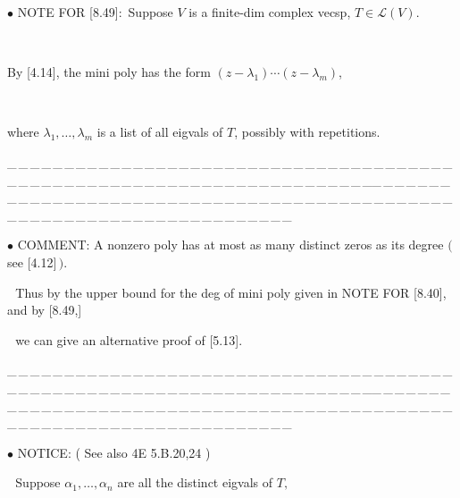 \documentclass[a4paper, 11pt, UTF8]{article}
\def\Lm{\mathcal{L}}
\begin{document}
\begin{large}
{\small $\bullet$} {\timesbf N{\small OTE} F{\small OR} [8.49]:}\,\,\,\Large Suppose $V$ is a finite-dim complex vecsp, $T\in\Lm(V).$\par\,\,
\centerline{By [4.14], the mini poly has the form $(z -\lambda_1 ) \cdots (z - \lambda_m)$,}\par\,\,
\centerline{\qquad\qquad where $\lambda_1,\dots,\lambda_m$ is a list of all eigvals of $T$, possibly with repetitions.}\large\par
{\tiny \_\,\_\,\_\,\_\,\_\,\_\,\_\,\_\,\_\,\_\,\_\,\_\,\_\,\_\,\_\,\_\,\_\,\_\,\_\,\_\,\_\,\_\,\_\,\_\,\_\,\_\,\_\,\_\,\_\,\_\,\_\,\_\,\_\,\_\,\_\,\_\,\_\,\_\,\_\,\_\,\_\,\_\,\_\,\_\,\_\,\_\,\_\,\_\,\_\,\_\,\_\,\_\,\_\,\_\,\_\,\_\,\_\,\_\,\_\,\_\,\_\,\_\,\_\,\_\,\_\,\_\,\_\,\_\,\_\,\_\,\_\_\,\_\,\_\,\_\,\_\,\_\,\_\,\_\,\_\,\_\,\_\,\_\,\_\,\_\,\_\,\_\,\_\,\_\,\_\,\_\,\_\,\_\,\_\,\_\,\_\,\_\,\_\,\_\,\_\,\_\,\_\,\_\,\_\,\_\,\_\,\_\,\_\,\_\,\_\,\_\,\_\,\_\,\_\,\_\,\_\,\_\,\_\,\_\,\_\,\_\,\_\,\_\,\_\,\_\,\_\,\_\,\_\,\_\,\_\,\_\,\_\,\_\,\_\,\_\,\_\,\_\,\_\,\_\,\_\,\_\,\_}\par
{\small $\bullet$} {\timesbf\large C{\small OMMENT}}:
{\Large A nonzero poly has at most as many distinct zeros as its degree $($ see $[$4.12$]\,)$.}\par\,\,
{\Large Thus by the upper bound for the deg of mini poly given in {\large N{\small OTE} F{\small OR} [8.40]}, and by [8.49,]}{\par}\,\,
{\Large we can {\timessc give an alternative proof of {\timesnr[}5.13{\timesnr]}}.}{\par}%
{\tiny \_\,\_\,\_\,\_\,\_\,\_\,\_\,\_\,\_\,\_\,\_\,\_\,\_\,\_\,\_\,\_\,\_\,\_\,\_\,\_\,\_\,\_\,\_\,\_\,\_\,\_\,\_\,\_\,\_\,\_\,\_\,\_\,\_\,\_\,\_\,\_\,\_\,\_\,\_\,\_\,\_\,\_\,\_\,\_\,\_\,\_\,\_\,\_\,\_\,\_\,\_\,\_\,\_\,\_\,\_\,\_\,\_\,\_\,\_\,\_\,\_\,\_\,\_\,\_\,\_\,\_\,\_\,\_\,\_\,\_\,\_\_\,\_\,\_\,\_\,\_\,\_\,\_\,\_\,\_\,\_\,\_\,\_\,\_\,\_\,\_\,\_\,\_\,\_\,\_\,\_\,\_\,\_\,\_\,\_\,\_\,\_\,\_\,\_\,\_\,\_\,\_\,\_\,\_\,\_\,\_\,\_\,\_\,\_\,\_\,\_\,\_\,\_\,\_\,\_\,\_\,\_\,\_\,\_\,\_\,\_\,\_\,\_\,\_\,\_\,\_\,\_\,\_\,\_\,\_\,\_\,\_\,\_\,\_\,\_\,\_\,\_\,\_\,\_\,\_\,\_\,\_}\par
{\small $\bullet$} {\timesbf N{\small OTICE}}: ( See also 4E 5.B.20,24 )\Large\par\,\,
Suppose $\alpha_1,\dots,\alpha_n$ are all the distinct eigvals of $T,$\par\qquad\quad

\end{large}
\end{document}
